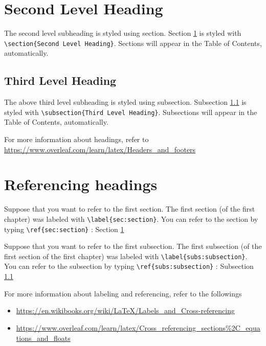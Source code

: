 \documentclass{report}
\begin{document}
\section{Second Level Heading}\label{sec:section}
The second level subheading is styled using section.
Section \ref{sec:section} is styled with \verb|\section{Second Level Heading}|.
Sections will appear in the Table of Contents, automatically.

%
\subsection{Third Level Heading}\label{subs:subsection}
The above third level subheading is styled using subsection.
Subsection \ref{subs:subsection} is styled with \verb|\subsection{Third Level Heading}|.
Subsections will appear in the Table of Contents, automatically.

For more information about headings, refer to \url{https://www.overleaf.com/learn/latex/Headers_and_footers}

%
\section{Referencing headings}\label{sec:referencing}
Suppose that you want to refer to the first section.
The first section (of the first chapter) was labeled with \verb|\label{sec:section}|.
You can refer to the section by typing \verb|\ref{sec:section}| : Section \ref{sec:section}

Suppose that you want to refer to the first subsection.
The first subsection (of the first section of the first chapter) was labeled with \verb|\label{subs:subsection}|.
You can refer to the subsection by typing \verb|\ref{subs:subsection}| : Subsection \ref{subs:subsection}

For more information about labeling and referencing, refer to the followings
\begin{itemize}
\item
\url{https://en.wikibooks.org/wiki/LaTeX/Labels_and_Cross-referencing}
\item
\url{https://www.overleaf.com/learn/latex/Cross_referencing_sections%2C_equations_and_floats}
\end{itemize}
\end{document}
